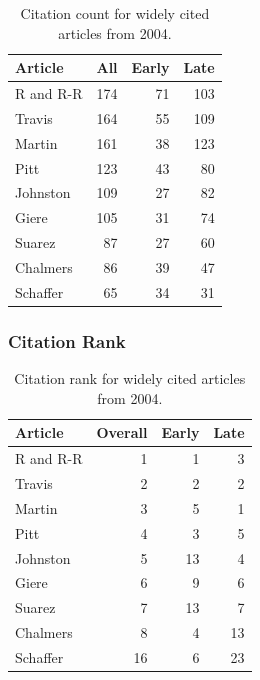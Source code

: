 \documentclass[
  10pt,
  letterpaper,
  DIV=11,
  numbers=noendperiod,
  twoside]{scrartcl}
\begin{document}
\begin{longtable}[]{@{}lrrr@{}}

\caption{\label{tbl-citation-count-2004}Citation count for widely cited
articles from 2004.}

\tabularnewline

\toprule\noalign{}
Article & All & Early & Late \\
\midrule\noalign{}
\endhead
\bottomrule\noalign{}
\endlastfoot
R and R-R & 174 & 71 & 103 \\
Travis & 164 & 55 & 109 \\
Martin & 161 & 38 & 123 \\
Pitt & 123 & 43 & 80 \\
Johnston & 109 & 27 & 82 \\
Giere & 105 & 31 & 74 \\
Suarez & 87 & 27 & 60 \\
Chalmers & 86 & 39 & 47 \\
Schaffer & 65 & 34 & 31 \\

\end{longtable}

\subsubsection*{Citation Rank}\label{sec-rank-2004}

\begin{longtable}[]{@{}lrrr@{}}

\caption{\label{tbl-citation-rank-2004}Citation rank for widely cited
articles from 2004.}

\tabularnewline

\toprule\noalign{}
Article & Overall & Early & Late \\
\midrule\noalign{}
\endhead
\bottomrule\noalign{}
\endlastfoot
R and R-R & 1 & 1 & 3 \\
Travis & 2 & 2 & 2 \\
Martin & 3 & 5 & 1 \\
Pitt & 4 & 3 & 5 \\
Johnston & 5 & 13 & 4 \\
Giere & 6 & 9 & 6 \\
Suarez & 7 & 13 & 7 \\
Chalmers & 8 & 4 & 13 \\
Schaffer & 16 & 6 & 23 \\

\end{longtable}
\end{document}
